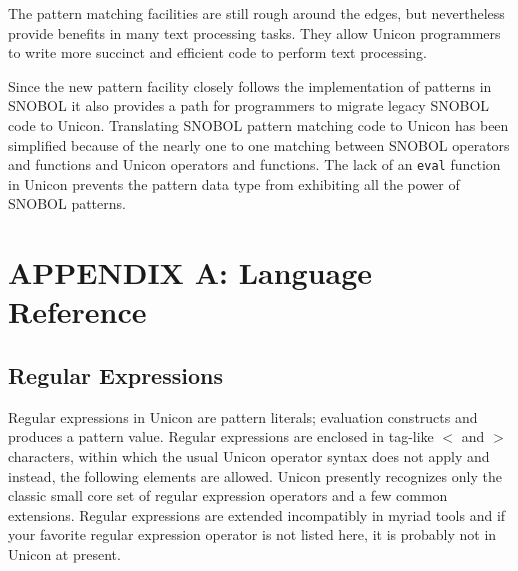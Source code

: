\documentclass[letterpaper,12pt]{article}
\begin{document}
{The pattern matching facilities are still rough around the edges, but
nevertheless provide benefits in many text processing tasks. They
allow Unicon programmers to write more succinct and efficient code to
perform text processing.

Since the new pattern facility closely follows the implementation of
patterns in SNOBOL it also provides a path for programmers to
migrate legacy SNOBOL code to Unicon. Translating SNOBOL pattern
matching code to Unicon has been simplified because of the
nearly one to one matching between SNOBOL operators and functions and
Unicon operators and functions. The lack of an {\tt eval} function in
Unicon prevents the pattern data type from exhibiting all the power
of SNOBOL patterns.


%
%

\appendix

\section*{APPENDIX A: Language Reference}
\thispagestyle{empty}

\subsection*{Regular Expressions}

Regular expressions in Unicon are pattern literals; evaluation
constructs and produces a pattern value.  Regular expressions
are enclosed in tag-like $<$ and $>$ characters, within which
the usual Unicon operator syntax does not apply and instead,
the following elements are allowed.  Unicon presently
recognizes only the classic small core set of regular
expression operators and a few common extensions.
Regular expressions are extended incompatibly in myriad tools and 
if your favorite regular expression operator is not listed here,
it is probably not in Unicon at present.


}
\end{document}
